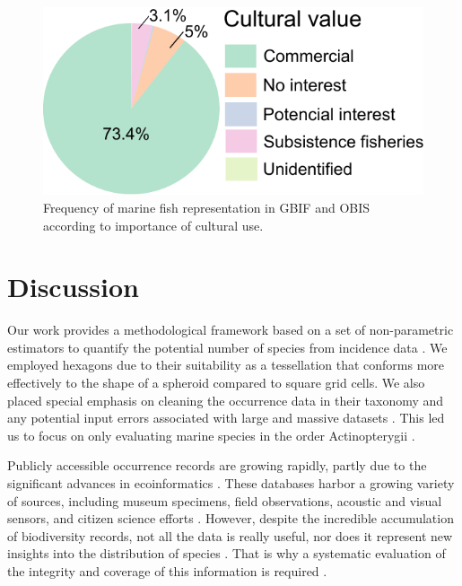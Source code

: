 \documentclass[12pt,authoryear]{elsarticle}
\begin{document}
\begin{figure}[h]
  \centering
  \includegraphics[width=.65\textwidth]{Fig6}
  \caption{Frequency of marine fish representation in GBIF and OBIS according to importance of cultural use.}
  \label{fig:A_importance}
\end{figure}


\section{Discussion}

Our work provides a methodological framework based on a set of non-parametric estimators to quantify the potential number of species from incidence data \citep{chao2009}. We employed hexagons due to their suitability as a tessellation that conforms more effectively to the shape of a spheroid compared to square grid cells. We also placed special emphasis on cleaning the occurrence data in their taxonomy \citep{jin2020bdcleaner} and any potential input errors associated with large and massive datasets \citep{zizka2020}. This led us to focus on only evaluating marine species in the order Actinopterygii \citep{alo2021macroecology}.

Publicly accessible occurrence records are growing rapidly, partly due to the significant advances in ecoinformatics  
\citep{lenoir2020species,oliver2021}. These databases harbor a growing variety of sources, including museum specimens, field observations, acoustic and visual sensors, and citizen science efforts \citep{amano2016}. However, despite the incredible accumulation of biodiversity records, not all the data is really useful, nor does it represent new insights into the distribution of species 
\citep{bayraktarov2019,zizka2020}. That is why a systematic evaluation of the integrity and coverage of this information is required \citep{troia2017}.
\end{document}
